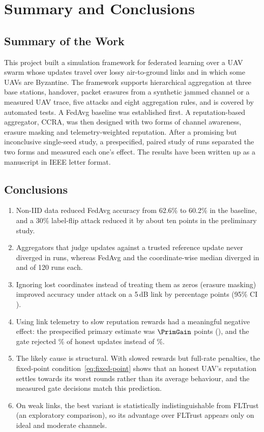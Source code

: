 \chapter{Summary and Conclusions}
\label{ch:conclusions}

\section{Summary of the Work}
This project built a simulation framework for federated learning over a UAV swarm
whose updates travel over lossy air-to-ground links and in which some UAVs are
Byzantine. The framework supports hierarchical aggregation at three base stations,
handover, packet erasures from a synthetic jammed channel or a measured UAV trace,
five attacks and eight aggregation rules, and is covered by automated tests. A FedAvg
baseline was established first. A reputation-based aggregator, CCRA, was then
designed with two forms of channel awareness, erasure masking and telemetry-weighted
reputation. After a promising but inconclusive single-seed study, a prespecified,
paired study of \NumRuns{} runs separated the two forms and measured each one's
effect. The results have been written up as a manuscript in IEEE letter format.

\section{Conclusions}
\begin{enumerate}
\item Non-IID data reduced FedAvg accuracy from 62.6\% to 60.2\% in the baseline,
  and a 30\% label-flip attack reduced it by about ten points in the preliminary
  study.
\item Aggregators that judge updates against a trusted reference update never
  diverged in \NumRuns{} runs, whereas FedAvg and the coordinate-wise median
  diverged in \DivFedavg{} and \DivMedian{} of 120 runs each.
\item Ignoring lost coordinates instead of treating them as zeros (erasure masking)
  improved accuracy under attack on a 5\,dB link by \MaskGain{} percentage points
  (95\% CI \ci{\MaskLo}{\MaskHi}).
\item Using link telemetry to slow reputation rewards had a meaningful negative
  effect: the prespecified primary estimate was $\PrimGain$ points
  (\ci{\PrimLo}{\PrimHi}), and the gate rejected \RejCcra\% of honest updates
  instead of \RejMask\%.
\item The likely cause is structural. With slowed rewards but full-rate penalties,
  the fixed-point condition~\eqref{eq:fixed-point} shows that an honest UAV's
  reputation settles towards its worst rounds rather than its average behaviour, and
  the measured gate decisions match this prediction.
\item On weak links, the best variant is statistically indistinguishable from
  FLTrust (an exploratory comparison), so its advantage over FLTrust appears only on
  ideal and moderate channels.
\end{enumerate}

